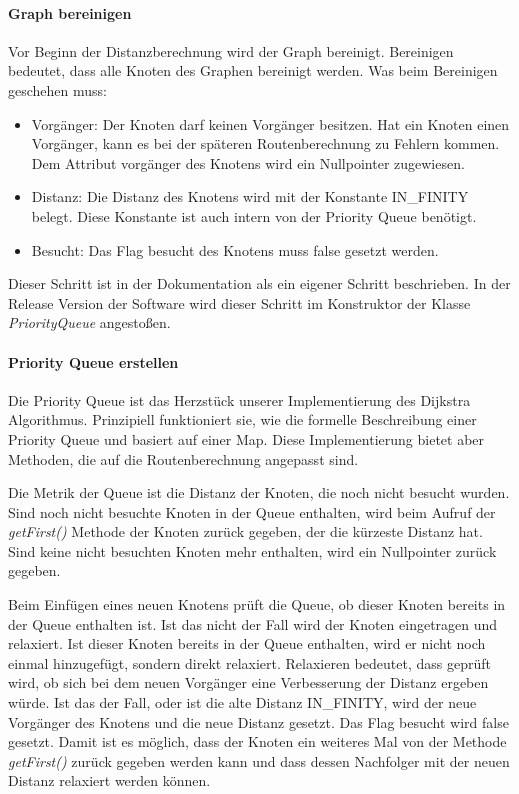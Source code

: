 \documentclass[12pt, a4paper, ngerman]{article}
\begin{document}
\paragraph{Graph bereinigen}
Vor Beginn der Distanzberechnung wird der Graph bereinigt. Bereinigen bedeutet, dass alle Knoten des Graphen bereinigt werden. Was beim Bereinigen geschehen muss:
\begin{itemize}
	\item Vorgänger: Der Knoten darf keinen Vorgänger besitzen. Hat ein Knoten einen Vorgänger, kann es bei der späteren Routenberechnung zu Fehlern kommen. Dem Attribut vorgänger des Knotens wird ein Nullpointer zugewiesen.
	\item Distanz: Die Distanz des Knotens wird mit der Konstante IN\_FINITY belegt. Diese Konstante ist auch intern von der Priority Queue benötigt.
	\item Besucht: Das Flag besucht des Knotens muss false gesetzt werden.
\end{itemize}

Dieser Schritt ist in der Dokumentation als ein eigener Schritt beschrieben. In der Release Version der Software wird dieser Schritt im Konstruktor der Klasse \textit{PriorityQueue} angestoßen.

\paragraph{Priority Queue erstellen \label{priorityQueueErstellen}}
Die Priority Queue ist das Herzstück unserer Implementierung des Dijkstra Algorithmus. Prinzipiell funktioniert sie, wie die formelle Beschreibung einer Priority Queue und basiert auf einer Map. Diese Implementierung bietet aber Methoden, die auf die Routenberechnung angepasst sind. 

Die Metrik der Queue ist die Distanz der Knoten, die noch nicht besucht wurden. Sind noch nicht besuchte Knoten in der Queue enthalten, wird beim Aufruf der \textit{getFirst()} Methode der Knoten zurück gegeben, der die kürzeste Distanz hat. Sind keine nicht besuchten Knoten mehr enthalten, wird ein Nullpointer zurück gegeben.

Beim Einfügen eines neuen Knotens prüft die Queue, ob dieser Knoten bereits in der Queue enthalten ist. Ist das nicht der Fall wird der Knoten eingetragen und relaxiert. Ist dieser Knoten bereits in der Queue enthalten, wird er nicht noch einmal hinzugefügt, sondern direkt relaxiert. Relaxieren bedeutet, dass geprüft wird, ob sich bei dem neuen Vorgänger eine Verbesserung der Distanz ergeben würde. Ist das der Fall, oder ist die alte Distanz IN\_FINITY, wird der neue Vorgänger des Knotens und die neue Distanz gesetzt. Das Flag besucht wird false gesetzt. Damit ist es möglich, dass der Knoten ein weiteres Mal von der Methode \textit{getFirst()} zurück gegeben werden kann und dass dessen Nachfolger mit der neuen Distanz relaxiert werden können.
\end{document}
